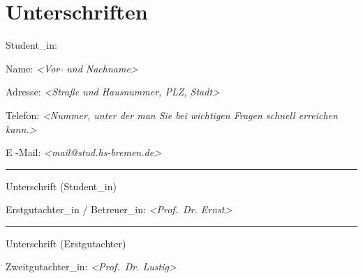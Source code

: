 \documentclass[11pt]{scrartcl}
\begin{document}
\section{Unterschriften}

Student\_in:

 Name: \textit{<Vor- und Nachname>}
 
 Adresse: \textit{<Straße und Hausnummer, PLZ, Stadt>}
 
 Telefon: \textit{<Nummer, unter der man Sie bei wichtigen Fragen schnell erreichen kann.>}
  
 E -Mail: \textit{<mail@stud.hs-bremen.de>}


 \hfill \rule{7cm}{0.2mm}

 \hfill Unterschrift (Student\_in)
 
\noindent
Erstgutachter\_in / Betreuer\_in: \textit{<Prof.~Dr. Ernst>} \\[0.2cm]

 \hfill \rule{7cm}{0.2mm}

 \hfill Unterschrift (Erstgutachter)


\noindent
Zweitgutachter\_in: \textit{<Prof.~Dr. Lustig>}




%
%
%
%



\printbibheading
\printbibliography[nottype=online, heading=subbibliography, title={Gedruckte Quellen}]
\printbibliography[type=online, heading=subbibliography, title={Online-Quellen}]
\end{document}
